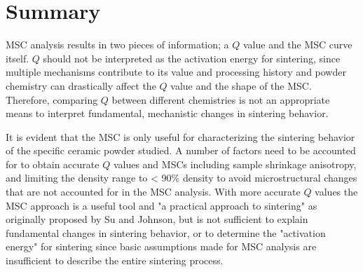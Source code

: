 \section{Summary}
MSC analysis results in two pieces of information; a $Q$ value and the MSC curve itself. $Q$ should not be interpreted as the activation energy for sintering, since multiple mechanisms contribute to its value and processing history and powder chemistry can drastically affect the $Q$ value and the shape of the MSC. Therefore, comparing $Q$ between different chemistries is not an appropriate means to interpret fundamental, mechanistic changes in sintering behavior. 

It is evident that the MSC is only useful for characterizing the sintering behavior of the specific ceramic powder studied. A number of factors need to be accounted for to obtain accurate $Q$ values and MSCs including sample shrinkage anisotropy, and limiting the density range to < 90\% density to avoid microstructural changes that are not accounted for in the MSC analysis. With more accurate $Q$ values the MSC approach is a useful tool and "a practical approach to sintering" as originally proposed by Su and Johnson, but is not sufficient to explain fundamental changes in sintering behavior, or to determine the "activation energy" for sintering since basic assumptions made for MSC analysis are insufficient to describe the entire sintering process.

